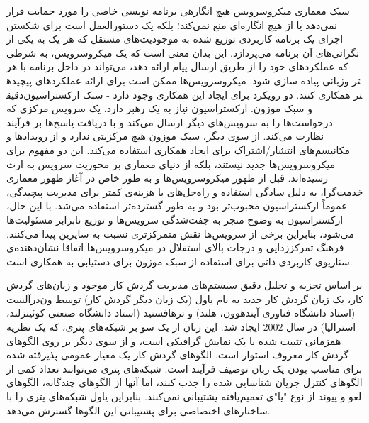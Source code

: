 سبک معماری میکروسرویس هیچ انگارهی برنامه نویسی خاصی را مورد حمایت قرار نمی‌دهد یا از هیچ انگاره‌ای منع نمی‌کند؛ بلکه یک دستورالعمل است برای شکستن اجزای یک برنامه کاربردی توزیع شده به موجودیت‌های مستقل که هر یک به یکی از نگرانی‌های آن برنامه می‌پردازد. این بدان معنی است که یک میکروسرویس، به شرطی که عملکردهای خود را از طریق ارسال پیام ارائه دهد، می‌تواند در داخل برنامه با هر زبانی پیاده سازی شود.
میکروسرویس‌ها ممکن است برای ارائه عملکردهای پیچیده‎تر و دقیق‎تر همکاری کنند. دو رویکرد برای ایجاد این همکاری وجود دارد - سبک ارکستراسیون و سبک موزون. ارکستراسیون نیاز به یک رهبر دارد. یک سرویس مرکزی که درخواست‌ها را به سرویس‌های دیگر ارسال می‌کند و با دریافت پاسخ‌ها بر فرآیند نظارت می‌کند. از سوی دیگر، سبک موزون هیچ مرکزیتی ندارد و از رویدادها و مکانیسم‌های انتشار/اشتراک برای ایجاد همکاری استفاده می‌کند. این دو مفهوم برای میکروسرویس‌ها جدید نیستند، بلکه از دنیای معماری بر محوریت سرویس به ارث رسیده‌اند.
قبل از ظهور میکروسرویس‌ها و به طور خاص در آغاز ظهور معماری خدمت‌گرا، به دلیل سادگی استفاده و راه‌حل‌های با هزینه‌ی کمتر برای مدیریت پیچیدگی، عموماً ارکستراسیون محبوب‌تر بود و به طور گسترده‌تر استفاده می‌شد. با این حال، ارکستراسیون به وضوح منجر به جفت‌شدگی سرویس‌ها و توزیع نابرابر مسئولیت‌ها می‌شود، بنابراین برخی از سرویس‌ها نقش متمرکزتری نسبت به سایرین پیدا می‌کنند. فرهنگ تمرکززدایی و درجات بالای استقلال در میکروسرویس‌ها اتفاقا نشان‌دهنده‌ی سناریوی کاربردی ذاتی برای استفاده از سبک موزون برای دستیابی به همکاری است.

بر اساس تجزیه و تحلیل دقیق سیستم‌های مدیریت گردش کار موجود و زبان‌های گردش کار، یک زبان گردش کار جدید به نام یاول (یک زبان دیگر گردش کار) توسط ون‌درآلست (استاد دانشگاه فناوری آیندهوون، هلند) و ترهافستید (استاد دانشگاه صنعتی کوئینزلند، استرالیا) در سال 2002 ایجاد شد. این زبان از یک سو بر شبکه‌های پتری، که یک نظریه همزمانی تثبیت شده با یک نمایش گرافیکی است، و از سوی دیگر بر روی الگوهای گردش کار معروف استوار است. الگوهای گردش کار یک معیار عمومی‌ پذیرفته شده‌ برای مناسب بودن یک زبان توصیف فرآیند است. شبکه‌های پتری می‌توانند تعداد کمی از الگوهای کنترل جریان شناسایی شده را جذب کنند، اما آنها از الگوهای چندگانه، الگوهای لغو و پیوند از نوع "یا"ی  تعمیم‌یافته پشتیبانی نمی‌کنند. بنابراین یاول شبکه‌های پتری را با ساختارهای اختصاصی برای پشتیبانی این الگوها گسترش می‌دهد.

